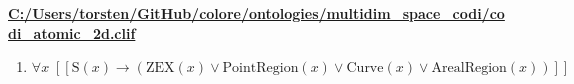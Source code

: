 \documentclass{article}
\begin{document}
\textbf{\url{C:/Users/torsten/GitHub/colore/ontologies/multidim\_space\_codi/codi\_atomic\_2d.clif}}

\begin{enumerate}
\item $\forall x\;  \left[ \left[ \textrm{S}(x) \rightarrow \left(\textrm{ZEX}(x) \lor \textrm{PointRegion}(x) \lor \textrm{Curve}(x) \lor \textrm{ArealRegion}(x)\right) \right] \right]$
\end{enumerate}
\end{document}

